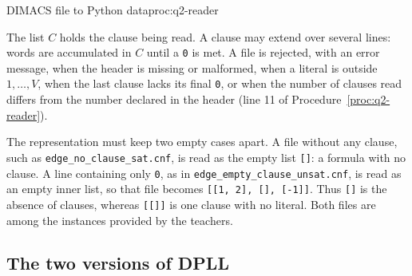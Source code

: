 \begin{pseudo}{DIMACS file to Python data}{proc:q2-reader}
\end{pseudo}

The list $C$ holds the clause being read. A clause may extend over several lines: words are accumulated in $C$ until a \texttt{0} is met. A file is rejected, with an error message, when the header is missing or malformed, when a literal is outside $1,\ldots,V$, when the last clause lacks its final \texttt{0}, or when the number of clauses read differs from the number declared in the header (line 11 of Procedure~\ref{proc:q2-reader}).

The representation must keep two empty cases apart. A file without any clause, such as \texttt{edge\_\allowbreak no\_\allowbreak clause\_\allowbreak sat.cnf}, is read as the empty list \texttt{[]}: a formula with no clause. A line containing only \texttt{0}, as in \texttt{edge\_\allowbreak empty\_\allowbreak clause\_\allowbreak unsat.cnf}, is read as an empty inner list, so that file becomes \texttt{[[1, 2], [], [-1]]}. Thus \texttt{[]} is the absence of clauses, whereas \texttt{[[]]} is one clause with no literal. Both files are among the instances provided by the teachers.

\subsection{The two versions of DPLL}

